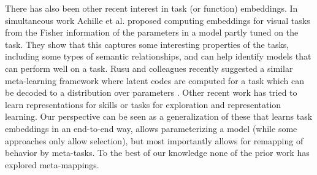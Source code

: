 \documentclass{article}
\begin{document}
There has also been other recent interest in task (or function) embeddings. In simultaneous work Achille et al. \citep{Achille2019} proposed computing embeddings for visual tasks from the Fisher information of the parameters in a model partly tuned on the task. They show that this captures some interesting properties of the tasks, including some types of semantic relationships, and can help identify models that can perform well on a task. Rusu and colleagues recently suggested a similar meta-learning framework where latent codes are computed for a task which can be decoded to a distribution over parameters \citep{Rusu2019}. Other recent work has tried to learn representations for skills \citep[e.g.][]{Eysenbach2019} or tasks \citep[e.g.]{Hsu2019} for exploration and representation learning. Our perspective can be seen as a generalization of these that learns task embeddings in an end-to-end way, allows parameterizing a model (while some approaches only allow selection), but most importantly allows for remapping of behavior by meta-tasks. To the best of our knowledge none of the prior work has explored meta-mappings. \par
\vspace{-1em}
\end{document}
